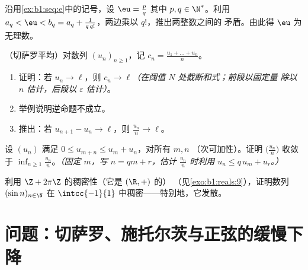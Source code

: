 \begin{exercise}[$\star\star\star$]\label{exo:b1:seq:9}
沿用\cref{ex:b1:seq:e}中的记号，设 $\eu = \frac pq$
其中 $p, q \in \N^*$。利用 $a_q < \eu < b_q = a_q + \frac{1}{q\,
q!}$，两边乘以 $q!$，推出两整数之间的
矛盾。由此得 $\eu$ 为无理数。
\end{exercise}

\begin{exercise}[$\star\star\star$]\label{exo:b1:seq:10}
（切萨罗平均）对数列 $(u_n)_{n \geq 1}$，记 $c_n =
\frac{u_1 + \dots + u_n}{n}$。
\begin{enumerate}
  \item 证明：若 $u_n \to \ell$，则 $c_n \to \ell$\emph{（在阈值
        $N$ 处截断和式；前段以固定量
        除以 $n$ 估计，后段以 $\varepsilon$ 估计）}。
  \item 举例说明逆命题不成立。
  \item 推出：若 $u_{n+1} - u_n \to \ell$，则 $\frac{u_n}{n}
        \to \ell$。
\end{enumerate}
\end{exercise}

\begin{exercise}[$\star\star\star$]\label{exo:b1:seq:11}
设 $(u_n)$ 满足 $0 \leq u_{m+n} \leq u_m + u_n$，对所有 $m, n$
（次可加性）。证明 $\bigl(\frac{u_n}{n}\bigr)$ 收敛于
$\inf_{n \geq 1} \frac{u_n}{n}$。\emph{（固定 $m$，写 $n = qm
+ r$，估计 $\frac{u_n}{n}$ 时利用 $u_n \leq q\,u_m + u_r$。）}
\end{exercise}

\begin{exercise}[$\star\star\star$]\label{exo:b1:seq:12}
利用 $\Z + 2\pi\Z$ 的稠密性（它是 $(\R, +)$ 的）
（见\cref{exo:b1:reals:9}），证明数列 $(\sin n)_{n \in
\N}$ 在 $\intcc{-1}{1}$ 中稠密——特别地，它发散。
\end{exercise}

\section{问题：切萨罗、施托尔茨与正弦的缓慢下降}

